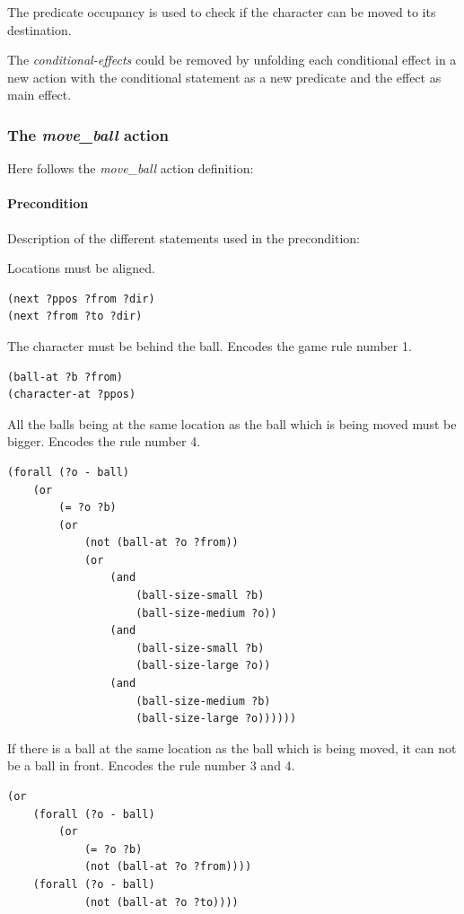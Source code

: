 \documentclass{report}
\theoremstyle{plain}
\begin{document}
The predicate occupancy is used to check if the character can be moved to its destination.

The \emph{conditional-effects} could be removed by unfolding each conditional effect in a new action with the conditional statement as a new predicate and the effect as main effect.

\subsubsection{The \emph{move\_ball} action}
Here follows the \emph{move\_ball} action  definition:

\paragraph{Precondition}
Description of the different statements used in the precondition:

Locations must be aligned.
\begin{lstlisting}
(next ?ppos ?from ?dir)
(next ?from ?to ?dir)
\end{lstlisting}

The character must be behind the ball. Encodes the game rule number 1.
\begin{lstlisting}
(ball-at ?b ?from)
(character-at ?ppos)
\end{lstlisting}

All the balls being at the same location as the ball which is being moved must be bigger. Encodes the rule number 4.
\begin{lstlisting}
(forall (?o - ball)
    (or 
        (= ?o ?b)
        (or 
            (not (ball-at ?o ?from))
            (or 
                (and
                    (ball-size-small ?b)
                    (ball-size-medium ?o))
                (and
                    (ball-size-small ?b)
                    (ball-size-large ?o))
                (and
                    (ball-size-medium ?b)
                    (ball-size-large ?o))))))
\end{lstlisting}

If there is a ball at the same location as the ball which is being moved, it can not be a ball in front. Encodes the rule number 3 and 4.
\begin{lstlisting}
(or
    (forall (?o - ball)
        (or 
            (= ?o ?b)
            (not (ball-at ?o ?from))))
    (forall (?o - ball)
            (not (ball-at ?o ?to))))
\end{lstlisting}
\end{document}
